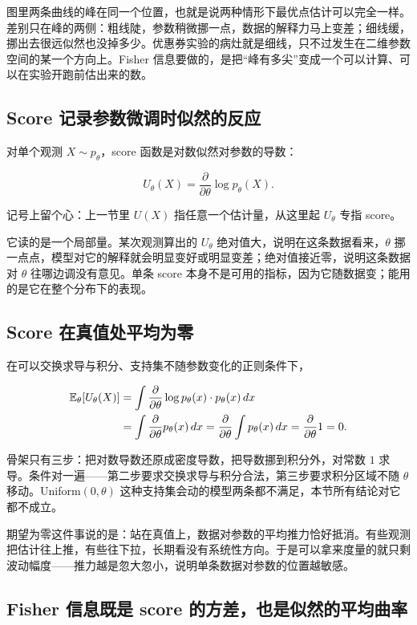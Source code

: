 图里两条曲线的峰在同一个位置，也就是说两种情形下最优点估计可以完全一样。差别只在峰的两侧：粗线陡，参数稍微挪一点，数据的解释力马上变差；细线缓，挪出去很远似然也没掉多少。优惠券实验的病灶就是细线，只不过发生在二维参数空间的某一个方向上。Fisher 信息要做的，是把``峰有多尖''变成一个可以计算、可以在实验开跑前估出来的数。

\subsection{Score 记录参数微调时似然的反应}

对单个观测 \(X\sim p_\theta\)，score 函数是对数似然对参数的导数：

\[
U_\theta(X)=\frac{\partial}{\partial\theta}\log p_\theta(X).
\]

记号上留个心：上一节里 \(U(X)\) 指任意一个估计量，从这里起 \(U_\theta\) 专指 score。

它读的是一个局部量。某次观测算出的 \(U_\theta\) 绝对值大，说明在这条数据看来，\(\theta\) 挪一点点，模型对它的解释就会明显变好或明显变差；绝对值接近零，说明这条数据对 \(\theta\) 往哪边调没有意见。单条 score 本身不是可用的指标，因为它随数据变；能用的是它在整个分布下的表现。

\subsection{Score 在真值处平均为零}

在可以交换求导与积分、支持集不随参数变化的正则条件下，

\[
\begin{aligned}
\mathbb{E}_\theta[U_\theta(X)]
&=\int\frac{\partial}{\partial\theta}\log p_\theta(x)\cdot p_\theta(x)\,dx\\
&=\int\frac{\partial}{\partial\theta}p_\theta(x)\,dx
=\frac{\partial}{\partial\theta}\int p_\theta(x)\,dx
=\frac{\partial}{\partial\theta}1=0.
\end{aligned}
\]

骨架只有三步：把对数导数还原成密度导数，把导数挪到积分外，对常数 \(1\) 求导。条件对一遍——第二步要求交换求导与积分合法，第三步要求积分区域不随 \(\theta\) 移动。Uniform\((0,\theta)\) 这种支持集会动的模型两条都不满足，本节所有结论对它都不成立。

期望为零这件事说的是：站在真值上，数据对参数的平均推力恰好抵消。有些观测把估计往上推，有些往下拉，长期看没有系统性方向。于是可以拿来度量的就只剩波动幅度——推力越是忽大忽小，说明单条数据对参数的位置越敏感。

\subsection{Fisher 信息既是 score 的方差，也是似然的平均曲率}


